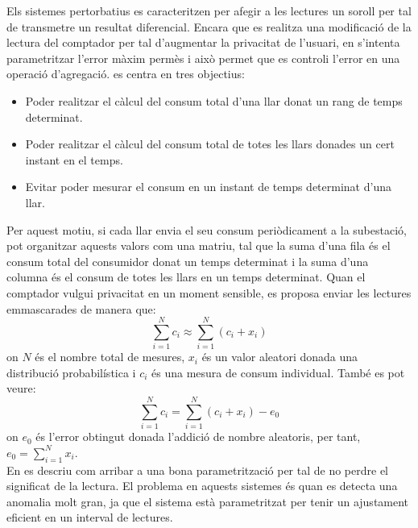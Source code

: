 
Els sistemes pertorbatius es caracteritzen per afegir a les lectures un soroll per tal de transmetre un resultat diferencial. Encara que es realitza una modificació de la lectura del comptador per tal d'augmentar la privacitat de l'usuari, en \cite{smart-grid-technique} s'intenta parametritzar l'error màxim permès i això permet que es controli l'error en una operació d'agregació. \cite{smart-grid-technique} es centra en tres objectius:
\begin{itemize}
	\item Poder realitzar el càlcul del consum total d'una llar donat un rang de temps determinat.
	\item Poder realitzar el càlcul del consum total de totes les llars donades un cert instant en el temps.
	\item Evitar poder mesurar el consum en un instant de temps determinat d'una llar.
\end{itemize}
Per aquest motiu, si cada llar envia el seu consum periòdicament a la subestació, pot organitzar aquests valors com una matriu, tal que la suma d'una fila és el consum total del consumidor donat un temps determinat i la suma d'una columna és el consum de totes les llars en un temps determinat. Quan el comptador vulgui privacitat en un moment sensible, es proposa enviar les lectures emmascarades de manera que:
\[\sum_{i=1}^{N} c_i \approx \sum_{i=1}^{N} (c_i + x_i)\]
on $N$ és el nombre total de mesures, $x_i$ és un valor aleatori donada una distribució probabilística i $c_i$ és una mesura de consum individual. També es pot veure:
\[\sum_{i=1}^{N} c_i = \sum_{i=1}^{N} (c_i + x_i) - e_0\]
on $e_0$ és l'error obtingut donada l'addició de nombre aleatoris, per tant, $e_0 = \sum_{i=1}^{N}x_i$.\\
En \cite{smart-grid-technique} es descriu com arribar a una bona parametrització per tal de no perdre el significat de la lectura. El problema en aquests sistemes és quan es detecta una anomalia molt gran, ja que el sistema està parametritzat per tenir un ajustament eficient en un interval de lectures.
